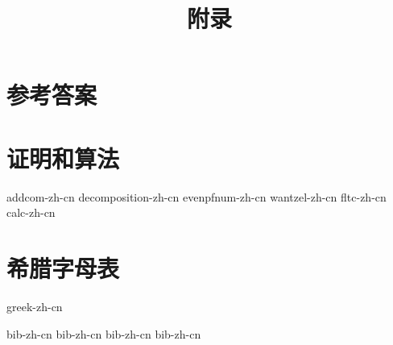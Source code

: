 \documentclass[b5paper]{ctexart}
\begin{document}
\title{附录}

\maketitle
\fi

\chapter{参考答案}
\label{ch:answers}
\shipoutAnswer

\chapter{证明和算法}

{addcom-zh-cn}
{decomposition-zh-cn}
{evenpfnum-zh-cn}
{wantzel-zh-cn}
{fltc-zh-cn}
{calc-zh-cn}

\chapter{希腊字母表} \label{ch:greek-letters}
{greek-zh-cn}

\markboth{\bibname}{}

\begin{thebibliography}{99}
  {bib-zh-cn}
  {bib-zh-cn}
  {bib-zh-cn}
  {bib-zh-cn}
\end{thebibliography}

\ifx\wholebook\relax \else
\expandafter\enddocument
\fi
\end{document}
